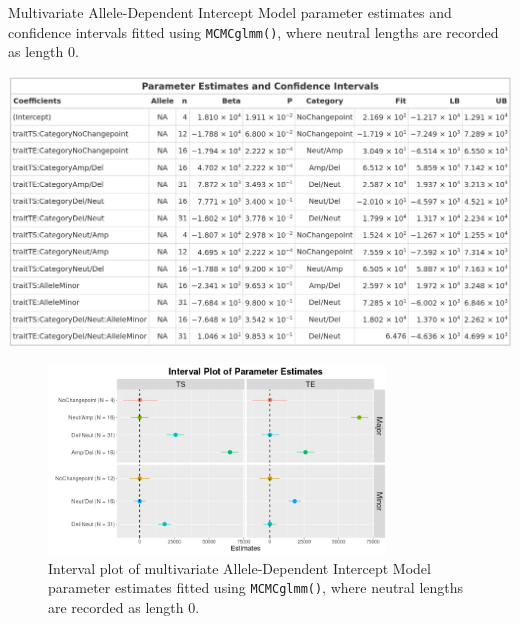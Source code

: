 \begin{table}[!htb]
\centering
\caption[Multivariate Allele-Dependent Intercept Model parameter estimates and confidence intervals fitted using \texttt{MCMCglmm()}.]{Multivariate Allele-Dependent Intercept Model parameter estimates and confidence intervals fitted using \texttt{MCMCglmm()}, where neutral lengths are recorded as length 0.}
      
\includegraphics[width = 1\textwidth]{../tables/Chapter_5/Multivariate_MCMC_7_AD_Model_Pred.png}
\end{table}

\begin{figure}[!htb]
\vspace{0.5cm}
     
\centering
\includegraphics[width = 0.8\textwidth]{../figures/Chapter_5/Multivariate_MCMC_7_AD_Interval.png}
 
\caption[Interval plot of multivariate Allele-Dependent Intercept Model parameter estimates fitted using \texttt{MCMCglmm()}.]{Interval plot of multivariate Allele-Dependent Intercept Model parameter estimates fitted using \texttt{MCMCglmm()}, where neutral lengths are recorded as length 0.}
\end{figure}

